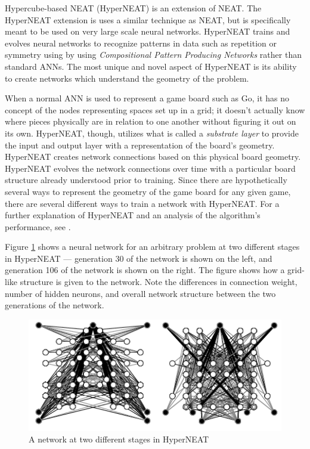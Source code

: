 Hypercube-based NEAT (HyperNEAT) is an extension of NEAT.  The HyperNEAT extension is uses a similar technique as NEAT, but is specifically meant to be used on very large scale neural networks.  HyperNEAT trains and evolves neural networks to recognize patterns in data such as repetition or symmetry using by using \textit{Compositional Pattern Producing Networks} rather than standard ANNs.  The most unique and novel aspect of HyperNEAT is its ability to create networks which understand the geometry of the problem. \cite{HyperNEAT}

When a normal ANN is used to represent a game board such as Go, it has no concept of the nodes representing spaces set up in a grid; it doesn't actually know where pieces physically are in relation to one another without figuring it out on its own.  HyperNEAT, though, utilizes what is called a \textit{substrate layer} to provide the input and output layer with a representation of the board's geometry.  HyperNEAT creates network connections based on this physical board geometry.  HyperNEAT evolves the network connections over time with a particular board structure already understood prior to training.  Since there are hypothetically several ways to represent the geometry of the game board for any given game, there are several different ways to train a network with HyperNEAT.  For a further explanation of HyperNEAT and an analysis of the algorithm's performance, see \cite{HyperNEAT}.

Figure \ref{fig:neatnet} shows a neural network for an arbitrary problem at two different stages in HyperNEAT --- generation 30 of the network is shown on the left, and generation 106 of the network is shown on the right.  The figure shows how a grid-like structure is given to the network.  Note the differences in connection weight, number of hidden neurons, and overall network structure between the two generations of the network.

\begin{figure}[h]
\centering
\includegraphics[scale=0.55]{images/hyperneatnets.png}
\caption{A network at two different stages in HyperNEAT \cite{hyperpic}}
\label{fig:neatnet}
\end{figure}

